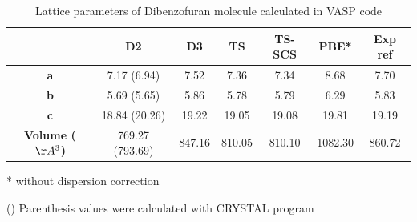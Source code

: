  	
 	\begin{table}[H]
 	\caption{Lattice parameters of Dibenzofuran molecule calculated in VASP code}  \label{table-dibenzofuransol}
 	\begin{center}
 		\begin{threeparttable}
 			\begin{tabular}{c c c c c c c}
 				\toprule
 				& \textbf{D2} & \textbf{D3} & \textbf{TS} & \textbf{TS-SCS} & \textbf{PBE*} & \textbf{Exp} ref\cite{dideberg1972crystal} \\
 				\midrule
 				\textbf{a} & 7.17 (6.94) & 7.52 & 7.36 &7.34 & 8.68 & 7.70 \\
 				\textbf{b}& 5.69 (5.65) & 5.86& 5.78 & 5.79 & 6.29 & 5.83\\
 				\textbf{c}& 18.84 (20.26) & 19.22 & 19.05 & 19.08 & 19.81 & 19.19\\
 				\textbf{Volume ($\AA^{3}$)}& 769.27 (793.69) & 847.16 & 810.05 & 810.10 & 1082.30 & 860.72\\
 				\bottomrule
 			\end{tabular}
 			
 				\begin{tablenotes}
 					\item[*] without dispersion correction
 					\item[()] Parenthesis values were calculated with CRYSTAL program
 				\end{tablenotes}
 			\end{threeparttable}
 		\end{center}
 	\end{table}
 	
